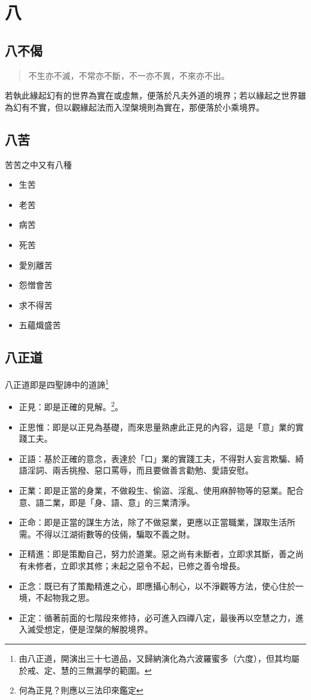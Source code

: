 \section{八}

\subsection{八不偈}
\begin{quote}
  不生亦不滅，不常亦不斷，不一亦不異，不來亦不出。
\end{quote}
若執此緣起幻有的世界為實在或虛無，便落於凡夫外道的境界；若以緣起之世界雖為幻有不實，但以觀緣起法而入涅槃境則為實在，那便落於小乘境界。


\subsection{八苦}
苦苦之中又有八種
\begin{itemize}
  \item 生苦
  \item 老苦
  \item 病苦
  \item 死苦
  \item 愛別離苦
  \item 怨憎會苦
  \item 求不得苦
  \item 五蘊熾盛苦
\end{itemize}

\subsection{八正道}
八正道即是四聖諦中的道諦\footnote{由八正道，開演出三十七道品，又歸納演化為六波羅蜜多（六度），但其均屬於戒、定、慧的三無漏學的範圍。}
\begin{itemize}
  \item 正見：即是正確的見解。\footnote{何為正見？則應以三法印來鑑定}。
  \item 正思惟：即是以正見為基礎，而來思量熟慮此正見的內容，這是「意」業的實踐工夫。
  \item 正語：基於正確的意念，表達於「口」業的實踐工夫，不得對人妄言欺騙、綺語淫詞、兩舌挑撥、惡口罵辱，而且要做善言勸勉、愛語安慰。
  \item 正業：即是正當的身業，不做殺生、偷盜、淫亂、使用麻醉物等的惡業。配合意、語二業，即是「身、語、意」的三業清淨。
  \item 正命：即是正當的謀生方法，除了不做惡業，更應以正當職業，謀取生活所需。不得以江湖術數等的伎倆，騙取不義之財。
  \item 正精進：即是策勵自己，努力於道業。惡之尚有未斷者，立即求其斷，善之尚有未修者，立即求其修；未起之惡令不起，已修之善令增長。
  \item 正念：既已有了策勵精進之心，即應攝心制心，以不淨觀等方法，使心住於一境，不起物我之思。
  \item 正定：循著前面的七階段來修持，必可進入四禪八定，最後再以空慧之力，進入滅受想定，便是涅槃的解脫境界。
\end{itemize}
